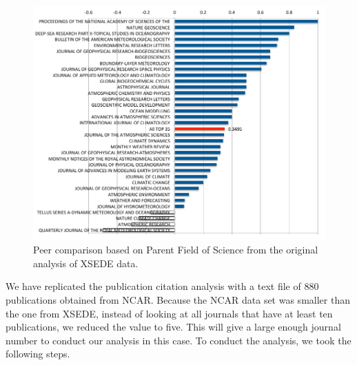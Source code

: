 \documentclass{sig-alternate}
\begin{document}
\begin{figure}[h!]
  \centering 
    \includegraphics[width=1.0\columnwidth]{images-new/ncar-c.pdf} 
  \caption{Peer comparison based on Parent Field of Science from the original analysis of XSEDE data.}\label{F:ncar-score}
\end{figure} 

We have replicated the publication citation analysis with a text file of 880 publications obtained from NCAR. Because the NCAR data set was smaller than the one from XSEDE, instead of looking at all journals that have at least ten publications, we reduced the value to five. This will give a large enough journal number to conduct our analysis in this case. To conduct the analysis, we took the following steps.
\end{document}
